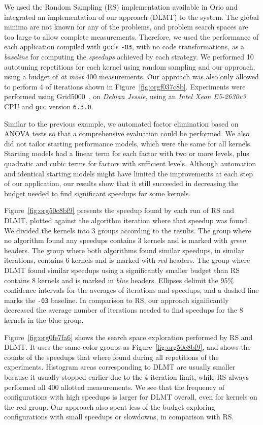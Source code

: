 \documentclass[conference]{IEEEtran}
\begin{document}
We used the Random Sampling (RS) implementation available in Orio and integrated
an implementation of our approach (DLMT) to the system. The global minima are
not known for any of the problems, and problem search spaces are too large to
allow complete measurements. Therefore, we used the performance of each
application compiled with \texttt{gcc}'s \texttt{-O3}, with no code
transformations, as a \emph{baseline} for computing the \emph{speedups} achieved by each
strategy. We performed 10 autotuning repetitions for each kernel using random
sampling and our approach, using a budget of \emph{at most} 400 measurements. Our
approach was also only allowed to perform 4 of iterations shown in
Figure~\ref{fig:orgf037c8b}. Experiments were performed using
Grid5000~\cite{balouek2013adding}, on \emph{Debian Jessie}, using an \emph{Intel
Xeon E5-2630v3} CPU and \texttt{gcc} version \texttt{6.3.0}.

Similar to the previous example, we automated factor elimination based on ANOVA
tests so that a comprehensive evaluation could be performed. We also did not
tailor starting performance models, which were the same for all kernels.
Starting models had a linear term for each factor with two or more levels, plus
quadratic and cubic terms for factors with sufficient levels. Although
automation and identical starting models might have limited the improvements at
each step of our application, our results show that it still succeeded in
decreasing the budget needed to find significant speedups for some kernels.

Figure~\ref{fig:org50c8bf9} presents the speedup found by each
run of RS and DLMT, plotted against the algorithm iteration where that speedup
was found. We divided the kernels into 3 groups according to the results. The
group where no algorithm found any speedups contains 3 kernels and is marked
with \emph{green} headers. The group where both algorithms found similar speedups, in
similar iterations, contains 6 kernels and is marked with \emph{red} headers. The
group where DLMT found similar speedups using a significantly smaller budget
than RS contains 8 kernels and is marked in \emph{blue} headers. Ellipses delimit the
95\% confidence intervals for the averages of iterations and speedups, and a
dashed line marks the \texttt{-03} baseline. In comparison to RS, our approach
significantly decreased the average number of iterations needed to find speedups
for the 8 kernels in the blue group.

Figure~\ref{fig:org0fe7fa6} shows the search space exploration performed
by RS and DLMT. It uses the same color groups as
Figure~\ref{fig:org50c8bf9}, and shows the counts of the speedups
that where found during all repetitions of the experiments. Histogram areas
corresponding to DLMT are usually smaller because it usually stopped earlier due
to the 4-iteration limit, while RS always performed all 400 allotted
measurements. We see that the frequency of configurations with high speedups is
larger for DLMT overall, even for kernels on the red group. Our approach also
spent less of the budget exploring configurations with small speedups or
slowdowns, in comparison with RS.
\end{document}
